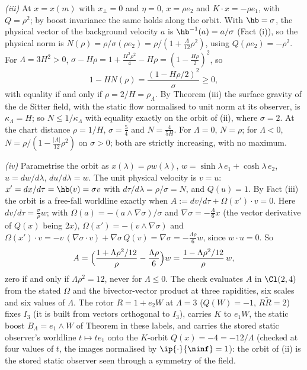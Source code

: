 \emph{(iii)} At $x = x(m)$ with $x_{\perp} = 0$ and $\eta = 0$, $x = \rho e_{2}$ and $K \cdot x = -\rho e_{1}$, with $Q = \rho^{2}$; by boost invariance the same holds along the orbit. With $\hb = \sigma$, the physical vector of the background velocity $a$ is $\hb^{-1}(a) = a/\sigma$ (Fact (i)), so the physical norm is $N(\rho) = \rho/\sigma(\rho e_{2}) = \rho/(1 + \tfrac{\Lambda}{12}\rho^{2})$, using $Q(\rho e_{2}) = -\rho^{2}$. For $\Lambda = 3H^{2} > 0$, $\sigma - H\rho = 1 + \tfrac{H^{2}\rho^{2}}{4} - H\rho = (1 - \tfrac{H\rho}{2})^{2}$, so
\[
1 - H N(\rho) = \frac{(1 - H\rho/2)^{2}}{\sigma} \ge 0 ,
\]
with equality if and only if $\rho = 2/H = \rho_{\Lambda}$. By Theorem (iii) the surface gravity of the de Sitter field, with the static flow normalised to unit norm at its observer, is $\kappa_{\Lambda} = H$; so $N \le 1/\kappa_{\Lambda}$ with equality exactly on the orbit of (ii), where $\sigma = 2$. At the chart distance $\rho = 1/H$, $\sigma = \tfrac54$ and $N = \tfrac{4}{5H}$. For $\Lambda = 0$, $N = \rho$; for $\Lambda < 0$, $N = \rho/(1 - \tfrac{|\Lambda|}{12}\rho^{2})$ on $\sigma > 0$; both are strictly increasing, with no maximum.

\emph{(iv)} Parametrise the orbit as $x(\lambda) = \rho w(\lambda)$, $w = \sinh\lambda\,e_{1} + \cosh\lambda\,e_{2}$, $u = dw/d\lambda$, $du/d\lambda = w$. The unit physical velocity is $v = u$: $x' = dx/d\tau = \hb(v) = \sigma v$ with $d\tau/d\lambda = \rho/\sigma = N$, and $Q(u) = 1$. By Fact (iii) the orbit is a free-fall worldline exactly when $A := dv/d\tau + \Omega(x') \cdot v = 0$. Here $dv/d\tau = \tfrac{\sigma}{\rho}w$; with $\Omega(a) = -(a \wedge \nabla\sigma)/\sigma$ and $\nabla\sigma = -\tfrac{\Lambda}{6}x$ (the vector derivative of $Q(x)$ being $2x$), $\Omega(x') = -(v \wedge \nabla\sigma)$ and $\Omega(x') \cdot v = -v\,(\nabla\sigma \cdot v) + \nabla\sigma\,Q(v) = \nabla\sigma = -\tfrac{\Lambda\rho}{6}w$, since $w \cdot u = 0$. So
\[
A = \Bigl(\frac{1 + \Lambda\rho^{2}/12}{\rho} - \frac{\Lambda\rho}{6}\Bigr)w = \frac{1 - \Lambda\rho^{2}/12}{\rho}\,w ,
\]
zero if and only if $\Lambda\rho^{2} = 12$, never for $\Lambda \le 0$. The check evaluates $A$ in $\Cl(2,4)$ from the stated $\Omega$ and the bivector-vector product at three rapidities, six scales and six values of $\Lambda$. The rotor $R = 1 + e_{2}W$ at $\Lambda = 3$ ($Q(W) = -1$, $R\tilde R = 2$) fixes $I_{3}$ (it is built from vectors orthogonal to $I_{3}$), carries $K$ to $e_{1}W$, the static boost $B_{\Lambda} = e_{1} \wedge W$ of Theorem  in these labels, and carries the stored static observer's worldline $t \mapsto te_{1}$ onto the $K$-orbit $Q(x) = -4 = -12/\Lambda$ (checked at four values of $t$, the images normalised by $\ip{\cdot}{\ninf} = 1$): the orbit of (ii) is the stored static observer seen through a symmetry of the field.

